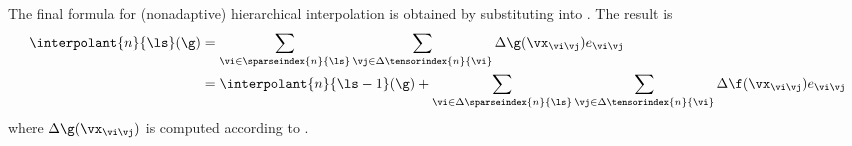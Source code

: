 The final formula for (nonadaptive) hierarchical interpolation is obtained by
substituting  into .
The result is
\begin{align*}
  \interpolant{n}{\ls}(\g)
  &= \sum_{\vi \in \sparseindex{n}{\ls}} \sum_{\vj \in \Delta\tensorindex{n}{\vi}} \Delta\g(\vx_{\vi \vj}) e_{\vi \vj} \\
  &= \interpolant{n}{\ls - 1}(\g) + \sum_{\vi \in \Delta\sparseindex{n}{\ls}} \sum_{\vj \in \Delta\tensorindex{n}{\vi}} \Delta\f(\vx_{\vi \vj}) e_{\vi \vj}
\end{align*}
where $\Delta\g(\vx_{\vi \vj})$ is computed according to
.
